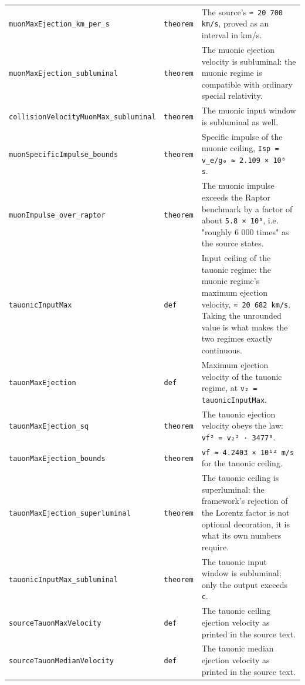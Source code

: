 \documentclass[11pt,a4paper]{article}
\begin{document}
\begin{center}
\begin{longtable}{@{}p{}p{}p{}@{}}
\texttt{muonMaxEjection\_\allowbreak{}km\_\allowbreak{}per\_\allowbreak{}s} & \texttt{theorem} & \small The source's \texttt{≈ 20 700 km/s}, proved as an interval in km/s. \\
\texttt{muonMaxEjection\_\allowbreak{}subluminal} & \texttt{theorem} & \small The muonic ejection velocity is subluminal: the muonic regime is compatible with ordinary special relativity. \\
\texttt{collisionVelocityMuonMax\_\allowbreak{}subluminal} & \texttt{theorem} & \small The muonic input window is subluminal as well. \\
\texttt{muonSpecificImpulse\_\allowbreak{}bounds} & \texttt{theorem} & \small Specific impulse of the muonic ceiling, \texttt{Isp = v\_\allowbreak{}e/g₀ ≈ 2.109 × 10⁶ s}. \\
\texttt{muonImpulse\_\allowbreak{}over\_\allowbreak{}raptor} & \texttt{theorem} & \small The muonic impulse exceeds the Raptor benchmark by a factor of about \texttt{5.8 × 10³}, i.e. "roughly 6 000 times" as the source states. \\
\texttt{tauonicInputMax} & \texttt{def} & \small Input ceiling of the tauonic regime: the muonic regime's maximum ejection velocity, \texttt{≈ 20 682 km/s}.  Taking the unrounded value is what makes the two regimes exactly continuous. \\
\texttt{tauonMaxEjection} & \texttt{def} & \small Maximum ejection velocity of the tauonic regime, at \texttt{v₂ = tauonicInputMax}. \\
\texttt{tauonMaxEjection\_\allowbreak{}sq} & \texttt{theorem} & \small The tauonic ejection velocity obeys the law: \texttt{vf² = v₂² · 3477³}. \\
\texttt{tauonMaxEjection\_\allowbreak{}bounds} & \texttt{theorem} & \small \texttt{vf ≈ 4.2403 × 10¹² m/s} for the tauonic ceiling. \\
\texttt{tauonMaxEjection\_\allowbreak{}superluminal} & \texttt{theorem} & \small The tauonic ceiling is superluminal: the framework's rejection of the Lorentz factor is not optional decoration, it is what its own numbers require. \\
\texttt{tauonicInputMax\_\allowbreak{}subluminal} & \texttt{theorem} & \small The tauonic input window is subluminal; only the output exceeds \texttt{c}. \\
\texttt{sourceTauonMaxVelocity} & \texttt{def} & \small The tauonic ceiling ejection velocity as printed in the source text. \\
\texttt{sourceTauonMedianVelocity} & \texttt{def} & \small The tauonic median ejection velocity as printed in the source text. \\

\end{longtable}
\end{center}
\end{document}
